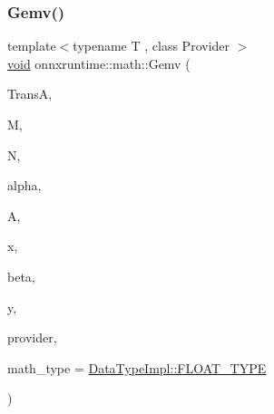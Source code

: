 \subsubsection{\texorpdfstring{Gemv()}{Gemv()}}
{\footnotesize\ttfamily template$<$typename T , class Provider $>$ \\
\mbox{\hyperlink{mlasi_8h_a88f941d423cb2a819b70a1358982b1a6}{void}} onnxruntime\+::math\+::\+Gemv (\begin{DoxyParamCaption}\item[{const \mbox{\hyperlink{cblas_8h_a44dfaddb823648755b110dbad849c5a9}{C\+B\+L\+A\+S\+\_\+\+T\+R\+A\+N\+S\+P\+O\+SE}}}]{TransA,  }\item[{const int}]{M,  }\item[{const int}]{N,  }\item[{const float}]{alpha,  }\item[{const T $\ast$}]{A,  }\item[{const T $\ast$}]{x,  }\item[{const float}]{beta,  }\item[{T $\ast$}]{y,  }\item[{Provider $\ast$}]{provider,  }\item[{\mbox{\hyperlink{namespaceonnxruntime_ad77d0a6e838ec7da5dc35fed5ee66b49}{M\+L\+Data\+Type}}}]{math\+\_\+type = {\ttfamily \mbox{\hyperlink{math_8h_a41cf4177f569cb6b87ec5c90c0165769}{Data\+Type\+Impl\+::\+F\+L\+O\+A\+T\+\_\+\+T\+Y\+PE}}} }\end{DoxyParamCaption})}

\mbox{\label{namespaceonnxruntime_1_1math_a8fecd4da59b1aaf9bb4fc371a40037b7}} 
